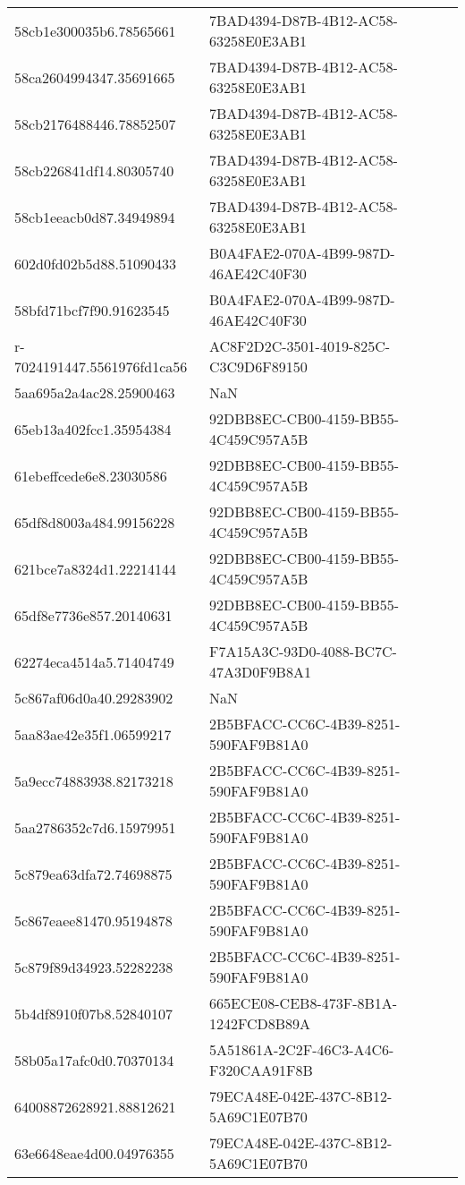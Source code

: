 \begin{tabular}{ll}
58cb1e300035b6.78565661 & 7BAD4394-D87B-4B12-AC58-63258E0E3AB1 \\
58ca2604994347.35691665 & 7BAD4394-D87B-4B12-AC58-63258E0E3AB1 \\
58cb2176488446.78852507 & 7BAD4394-D87B-4B12-AC58-63258E0E3AB1 \\
58cb226841df14.80305740 & 7BAD4394-D87B-4B12-AC58-63258E0E3AB1 \\
58cb1eeacb0d87.34949894 & 7BAD4394-D87B-4B12-AC58-63258E0E3AB1 \\
602d0fd02b5d88.51090433 & B0A4FAE2-070A-4B99-987D-46AE42C40F30 \\
58bfd71bcf7f90.91623545 & B0A4FAE2-070A-4B99-987D-46AE42C40F30 \\
r-7024191447.5561976fd1ca56 & AC8F2D2C-3501-4019-825C-C3C9D6F89150 \\
5aa695a2a4ac28.25900463 & NaN \\
65eb13a402fcc1.35954384 & 92DBB8EC-CB00-4159-BB55-4C459C957A5B \\
61ebeffcede6e8.23030586 & 92DBB8EC-CB00-4159-BB55-4C459C957A5B \\
65df8d8003a484.99156228 & 92DBB8EC-CB00-4159-BB55-4C459C957A5B \\
621bce7a8324d1.22214144 & 92DBB8EC-CB00-4159-BB55-4C459C957A5B \\
65df8e7736e857.20140631 & 92DBB8EC-CB00-4159-BB55-4C459C957A5B \\
62274eca4514a5.71404749 & F7A15A3C-93D0-4088-BC7C-47A3D0F9B8A1 \\
5c867af06d0a40.29283902 & NaN \\
5aa83ae42e35f1.06599217 & 2B5BFACC-CC6C-4B39-8251-590FAF9B81A0 \\
5a9ecc74883938.82173218 & 2B5BFACC-CC6C-4B39-8251-590FAF9B81A0 \\
5aa2786352c7d6.15979951 & 2B5BFACC-CC6C-4B39-8251-590FAF9B81A0 \\
5c879ea63dfa72.74698875 & 2B5BFACC-CC6C-4B39-8251-590FAF9B81A0 \\
5c867eaee81470.95194878 & 2B5BFACC-CC6C-4B39-8251-590FAF9B81A0 \\
5c879f89d34923.52282238 & 2B5BFACC-CC6C-4B39-8251-590FAF9B81A0 \\
5b4df8910f07b8.52840107 & 665ECE08-CEB8-473F-8B1A-1242FCD8B89A \\
58b05a17afc0d0.70370134 & 5A51861A-2C2F-46C3-A4C6-F320CAA91F8B \\
64008872628921.88812621 & 79ECA48E-042E-437C-8B12-5A69C1E07B70 \\
63e6648eae4d00.04976355 & 79ECA48E-042E-437C-8B12-5A69C1E07B70 \\

\end{tabular}
